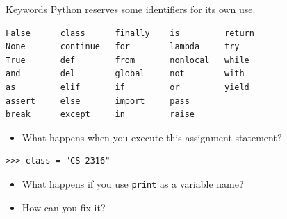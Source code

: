 \documentclass[smaller, aspectratio=1610]{beamer}
\begin{document}
\begin{frame}[label={sec:org622cf5e},fragile]{Keywords}
 Python reserves some identifiers for its own use.

\lstset{language=Python,label= ,caption= ,captionpos=b,numbers=none}
\begin{lstlisting}
False      class      finally    is         return
None       continue   for        lambda     try
True       def        from       nonlocal   while
and        del        global     not        with
as         elif       if         or         yield
assert     else       import     pass
break      except     in         raise
\end{lstlisting}


\begin{itemize}
\item What happens when you execute this assignment statement?
\end{itemize}

\lstset{language=Python,label= ,caption= ,captionpos=b,numbers=none}
\begin{lstlisting}
>>> class = "CS 2316"
\end{lstlisting}


\begin{itemize}
\item What happens if you use \texttt{print} as a variable name?
\item How can you fix it?
\end{itemize}
\end{frame}
\end{document}
